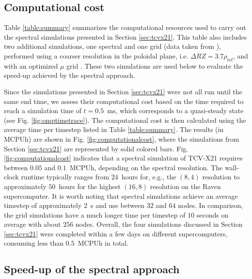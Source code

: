 \documentclass[preprint,12pt]{elsarticle}
\newcommand{\rhoref}{\rho_{\mathrm{ref}}}
\begin{document}
\subsection{Computational cost}
\label{subsec:computationcost}

Table \ref{table:summary} summarizes the computational resources used to carry out the spectral simulations presented in Section \ref{sec:tcvx21}. This table also includes two additional simulations, one spectral and one grid (data taken from \cite{ulbl2023}), performed using a coarser resolution in the poloidal plane, i.e. $\Delta RZ = 3.7 \rhoref$, and with an optimized $\mu$ grid \cite{ulbl2023phd}. These two simulations are used below to evaluate the speed-up achieved by the spectral approach.

Since the simulations presented in Section \ref{sec:tcvx21} were not all run until the same end time, we assess their computational cost based on the time required to reach a simulation time of $ t = 0.5 $~ms, which corresponds to a quasi-steady state (see Fig. \ref{fig:omptimetrace}). The computational cost is then calculated using the average time per timestep listed in Table \ref{table:summary}. The results (in MCPUh) are shown in Fig. \ref{fig:computationalcost}, where the simulations from Section \ref{sec:tcvx21} are represented by solid colored bars. Fig. \ref{fig:computationalcost} indicates that a spectral simulation of TCV-X21 requires between $ 0.05 $ and $ 0.1 $~MCPUh, depending on the spectral resolution. The wall-clock runtime typically ranges from $24$~hours for, e.g., the $(8,4)$ resolution to approximately $50$~hours for the highest $(16,8)$ resolution on the Raven supercomputer. It is worth noting that spectral simulations achieve an average timestep of approximately $2$~s and use between $32$ and $64$ nodes. In comparison, the grid simulations have a much longer time per timestep of $10$ seconds on average with about $256$ nodes. Overall, the four simulations discussed in Section \ref{sec:tcvx21} were completed within a few days on different supercomputers, consuming less than $0.5$~MCPUh in total. 

\subsection{Speed-up of the spectral approach}
\label{subsec:speedup}
\end{document}
